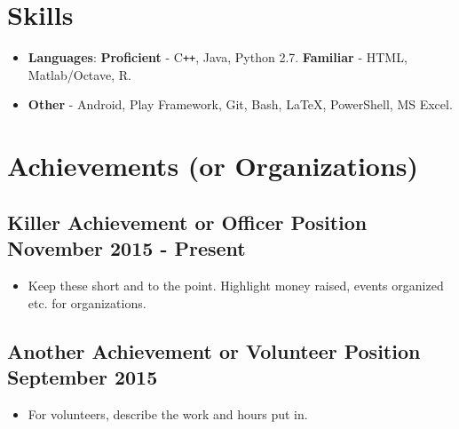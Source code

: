 \documentclass{article}
\begin{document}
\section*{Skills}
\begin{itemize}
    \itemsep0em
    \item \textbf{Languages}: \textbf{Proficient} - C\texttt{++}, Java, Python 2.7. \textbf{Familiar} - HTML, Matlab/Octave, R.
    \ \ \ \ \ \ 
    \item \textbf{Other} - Android, Play Framework, Git, Bash, \LaTeX, PowerShell, MS Excel.
\end{itemize}

\section*{Achievements (or Organizations)}

\subsection*{Killer Achievement or Officer Position\hspace{230pt}  {\normalsize \textmd{November 2015 - Present}}}
    \begin{itemize}
        \item Keep these short and to the point. Highlight money raised, events organized etc. for organizations.
    \end{itemize}

\subsection*{Another Achievement or Volunteer Position \hspace{220pt} {\normalsize \textmd{September 2015}}}
    \begin{itemize}
        \item For volunteers, describe the work and hours put in.
    \end{itemize}

    
\end{document}
